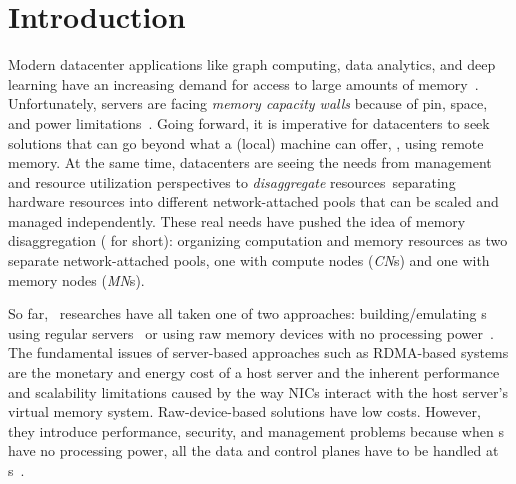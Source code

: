 \section{Introduction}
\label{sec:clio:introduction}

Modern datacenter applications like graph computing, data analytics, and deep learning have an increasing demand for access to large amounts of memory~\cite{FastSwap}.
Unfortunately, servers are facing {\em memory capacity walls} because of pin, space, and power limitations~\cite{HP-MemoryEvol,ITRS14,MemoryWall95}.
Going forward, it is imperative for datacenters to seek solutions that can go beyond what a (local) machine can offer, \ie, using remote memory.
At the same time, datacenters are seeing the needs from management and resource utilization perspectives
to {\em disaggregate} resources~\cite{Ali-SinglesDay,SnowFlake-NSDI20,FB1}\textemdash separating hardware resources into different network-attached pools 
that can be scaled and managed independently.
These real needs have pushed the idea of memory disaggregation ({\em \md} for short):
organizing computation and memory resources as two separate network-attached
pools, one with compute nodes ({\em CN}s) and one with memory nodes ({\em MN}s).

So far, \md\ researches have all taken one of two approaches: 
building/emulating \MN{}s using regular servers~\cite{AIFM,InfiniSwap,FastSwap,Shan18-OSDI,zombieland} 
or using raw memory devices with no processing power~\cite{Tsai20-ATC,Lim09-disaggregate,Lim12-HPCA,HP-TheMachine}.
The fundamental issues of server-based approaches such as RDMA-based systems are the monetary and energy cost of a host server and the inherent performance and scalability limitations caused by the way NICs interact with the host server's virtual memory system.
Raw-device-based solutions have low costs.
However, they introduce performance, security, and management problems
because when \MN{}s have no processing power, all the data and control planes have to be handled at \CN{}s~\cite{Tsai20-ATC}.

